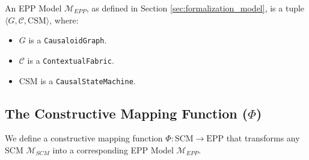 \begin{definition}
An EPP Model \(\mathcal{M}_{EPP}\), as defined in Section \ref{sec:formalization_model}, is a tuple \(\langle G, \mathcal{C}, \text{CSM} \rangle\), where:
\begin{itemize}
    \item \(G\) is a \texttt{CausaloidGraph}.
    \item \(\mathcal{C}\) is a \texttt{ContextualFabric}.
    \item \(\text{CSM}\) is a \texttt{CausalStateMachine}.
\end{itemize}
\end{definition}

\subsection*{The Constructive Mapping Function (\(\Phi\))}

We define a constructive mapping function \(\Phi: \text{SCM} \to \text{EPP}\) that transforms any SCM \(\mathcal{M}_{SCM}\) into a corresponding EPP Model \(\mathcal{M}_{EPP}\).

